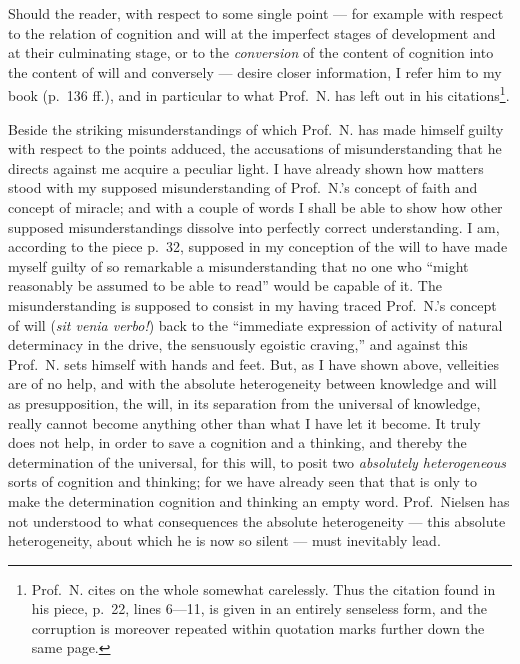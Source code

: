 \documentclass[12pt,a4paper]{book}
\begin{document}
Should the reader, with respect to some single point --- for example with
respect to the relation of cognition and will at the imperfect stages of
development and at their culminating stage, or to the \emph{conversion} of the
content of cognition into the content of will and conversely --- desire closer
information, I refer him to my book (p.\ 136 ff.), and in particular to what
Prof.\ N. has left out in his citations\footnote{%
  Prof.\ N. cites on the whole somewhat carelessly. Thus the citation found in
  his piece, p.\ 22, lines 6---11, is given in an entirely senseless form, and
  the corruption is moreover repeated within quotation marks further down the
  same page.}.

Beside the striking misunderstandings of which Prof.\ N. has made himself guilty
with respect to the points adduced, the accusations of misunderstanding that he
directs against me acquire a peculiar light. I have already shown how matters
stood with my supposed misunderstanding of Prof.\ N.'s concept of faith and
concept of miracle; and with a couple of words I shall be able to show how other
supposed misunderstandings dissolve into perfectly correct understanding. I am,
according to the piece p.\ 32, supposed in my conception of the will to have
made myself guilty of so remarkable a misunderstanding that no one who ``might
reasonably be assumed to be able to read'' would be capable of it. The
misunderstanding is supposed to consist in my having traced Prof.\ N.'s concept
of will (\textit{sit venia verbo!}) back to the
``immediate expression of activity of natural determinacy in the drive, the
sensuously egoistic craving,'' and against this Prof.\ N. sets himself with
hands and feet. But, as I have shown above, velleities are of no help, and with
the absolute heterogeneity between knowledge and will as
presupposition, the will, in its separation from the universal of knowledge,
really cannot become anything other than what I have let it become. It truly
does not help, in order to save a cognition and a thinking, and thereby the
determination of the universal, for this will, to posit two \emph{absolutely
heterogeneous} sorts of cognition and thinking; for we have already seen that
that is only to make the determination cognition and thinking an
empty word.
Prof.\ Nielsen has not understood to what consequences the absolute
heterogeneity --- this absolute heterogeneity, about which he is now so silent
--- must inevitably lead.
\end{document}
